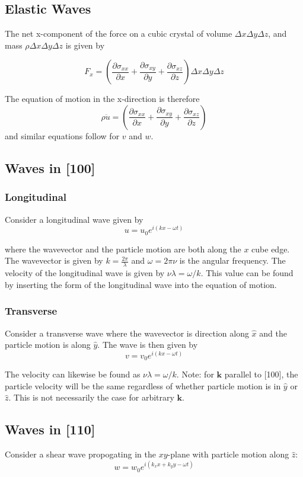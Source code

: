 \documentclass[10pt]{article}
\begin{document}
\subsection{Elastic Waves}
The net x-component of the force on a cubic crystal of volume $\Delta x \Delta y \Delta z$, and mass $\rho \Delta x \Delta y \Delta z $ is given by

$$
F_{x} = \left ( \frac{\partial \sigma_{xx}}{\partial x} + \frac{\partial \sigma_{xy}}{\partial y} + \frac{\partial \sigma_{xz}}{\partial z} \right)\Delta x \Delta y \Delta z
$$

The equation of motion in the x-direction is therefore
$$\rho \ddot{u} = \left ( \frac{\partial \sigma_{xx}}{\partial x} + \frac{\partial \sigma_{xy}}{\partial y} + \frac{\partial \sigma_{xz}}{\partial z} \right)$$
and similar equations follow for $v$ and $w$.

\subsection{Waves in [100]}
\subsubsection{Longitudinal}
Consider a longitudinal wave given by
$$ u = u_{0}e^{i(kx - \omega t)}$$

where the wavevector and the particle motion are both along the $x$ cube edge. The wavevector is given by $k = \frac{2\pi}{\lambda}$ and $\omega = 2\pi\nu$ is the
angular frequency. The velocity of the longitudinal wave is given by $\nu \lambda = \omega/k$. This value can be found by inserting the form of the longitudinal
wave into the equation of motion.

\subsubsection{Transverse}
Consider a transverse wave where the wavevector is direction along $\hat{x}$ and the particle motion is along $\hat{y}$. The wave is then given by
$$v = v_{0}e^{i(kx - \omega t)}$$

The velocity can likewise be found as $\nu \lambda = \omega/k$. Note: for $\textbf{k}$ parallel to [100], the particle velocity will be the same regardless of
whether particle motion is in $\hat{y}$ or $\hat{z}$. This is not necessarily the case for arbitrary $\textbf{k}$.

\subsection{Waves in [110] }
Consider a shear wave propogating in the $xy$-plane with particle motion along $\hat{z}$:
$$
w = w_{0}e^{i(k_{x}x + k_{y}y - \omega t)}
$$
\end{document}
